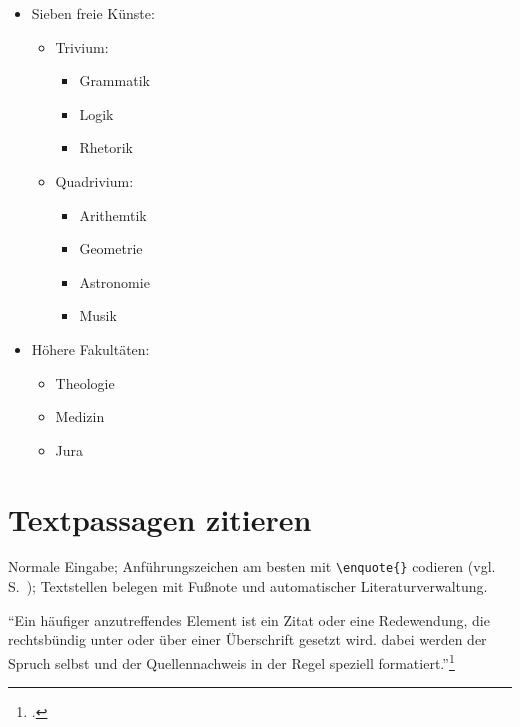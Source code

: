 \begin{LTXexample}
\begin{itemize}
 \item Sieben freie Künste:
 \begin{itemize}
   \item Trivium:
   \begin{itemize}
    \item Grammatik
    \item Logik
    \item Rhetorik
   \end{itemize}
   \item Quadrivium:
   \begin{itemize}
    \item Arithemtik
    \item Geometrie
    \item Astronomie
    \item Musik
   \end{itemize}
 \end{itemize}
 \item Höhere Fakultäten:
 \begin{itemize}
   \item Theologie
   \item Medizin
   \item Jura
 \end{itemize}
\end{itemize}
\end{LTXexample}




\section{Textpassagen zitieren}


Normale Eingabe;
Anführungszeichen am besten mit \lstinline/\enquote{}/ codieren (vgl. S.~\pageref{enquote}); 
Textstellen belegen mit Fußnote und automatischer Literaturverwaltung.



\enquote{Ein häufiger anzutreffendes Element ist ein Zitat oder eine Redewendung, die rechtsbündig unter 
oder über einer Überschrift gesetzt wird. dabei werden der Spruch selbst und der Quellennachweis
in der Regel speziell formatiert.}\footcite[131]{kohm:2014}

